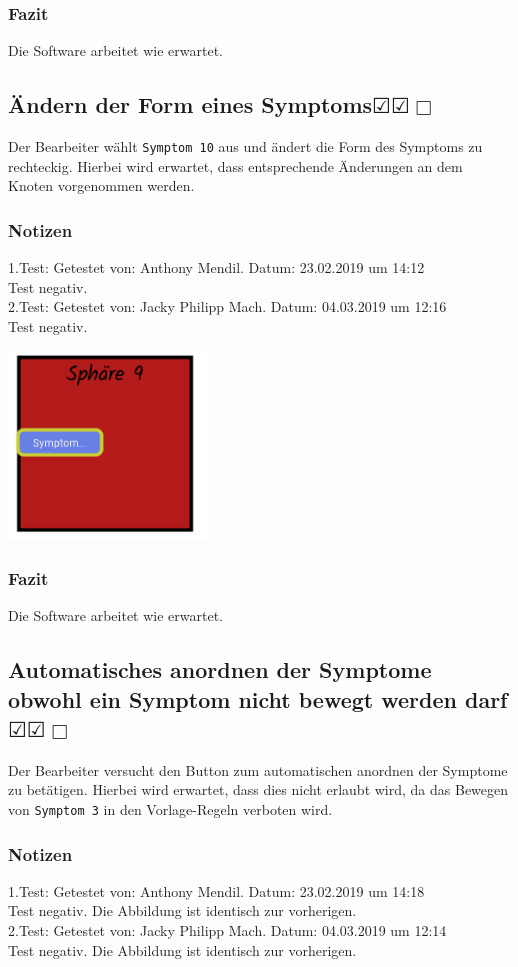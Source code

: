 \documentclass[enabledeprecatedfontcommands]{scrartcl}
\newcommand{\subsectiont}[2]{\subsection[#1]{#1{\normalsize\normalfont #2}}}
\newcommand{\leer}{$\Box$}
\newcommand{\ok}{$\CheckedBox$}
\begin{document}
\subsubsection{Fazit}
Die Software arbeitet wie erwartet.

\subsectiont{Ändern der Form eines Symptoms}{\dotfill\ok\ok\leer}
Der Bearbeiter wählt \texttt{Symptom 10} aus und ändert die Form des Symptoms zu rechteckig. Hierbei wird erwartet, dass entsprechende Änderungen an dem Knoten vorgenommen werden.
\subsubsection{Notizen}
1.Test: Getestet von: Anthony Mendil. Datum: 23.02.2019 um 14:12 \\
Test negativ.\\
2.Test: Getestet von: Jacky Philipp Mach. Datum: 04.03.2019 um 12:16 \\
Test negativ.
\begin{center}
\includegraphics[height=5cm]{2_27.PNG}
\end{center}
\subsubsection{Fazit}
Die Software arbeitet wie erwartet.

\subsectiont{Automatisches anordnen der Symptome obwohl ein Symptom nicht bewegt werden darf}{\dotfill\ok\ok\leer}
Der Bearbeiter versucht den Button zum automatischen anordnen der Symptome zu betätigen. Hierbei wird erwartet, dass dies nicht erlaubt wird, da das Bewegen von \texttt{Symptom 3} in den Vorlage-Regeln verboten wird. 
\subsubsection{Notizen}
1.Test: Getestet von: Anthony Mendil. Datum: 23.02.2019 um 14:18 \\
Test negativ. Die Abbildung ist identisch zur vorherigen. \\
2.Test: Getestet von: Jacky Philipp Mach. Datum: 04.03.2019 um 12:14 \\
Test negativ. Die Abbildung ist identisch zur vorherigen. 
\end{document}
